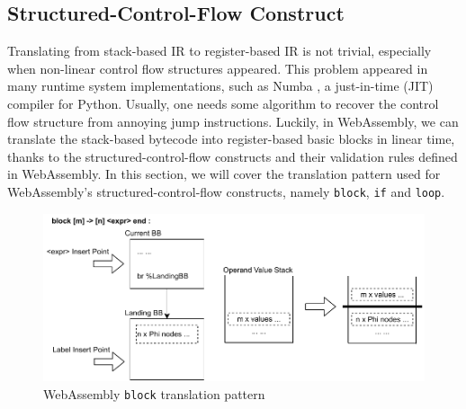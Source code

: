 \subsection{Structured-Control-Flow Construct}

Translating from stack-based IR to register-based IR is not trivial, especially when non-linear control flow structures appeared. This problem appeared in many runtime system implementations, such as Numba \cite{numba}, a just-in-time (JIT) compiler for Python. Usually, one needs some algorithm to recover the control flow structure from annoying jump instructions. Luckily, in WebAssembly, we can translate the stack-based bytecode into register-based basic blocks in linear time, thanks to the structured-control-flow constructs and their validation rules defined in WebAssembly. In this section, we will cover the translation pattern used for WebAssembly's structured-control-flow constructs, namely \texttt{block}, \texttt{if} and \texttt{loop}.

\begin{figure}
  \centering
  \includegraphics[width=\textwidth]{Images/4.MIR/translate-block.pdf}
  \caption{WebAssembly \texttt{block} translation pattern}
  \label{fig:translate-block}
\end{figure}

